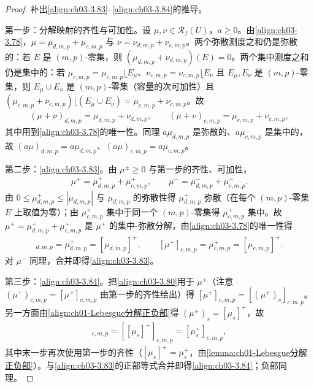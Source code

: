 \documentclass[../../main.tex]{subfiles}%
\begin{document}
\begin{proof}
补出\eqref{align:ch03-3.83}--\eqref{align:ch03-3.84}的推导。

第一步：分解映射的齐性与可加性。设 $\mu,\nu\in\mathscr{R}_f(U)$，$a\geqslant0$。由\eqref{align:ch03-3.78}，$\mu=\mu_{d,m,p}+\mu_{c,m,p}$ 与 $\nu=\nu_{d,m,p}+\nu_{c,m,p}$。两个弥散测度之和仍是弥散的：若 $E$ 是 $(m,p)$-零集，则 $(\mu_{d,m,p}+\nu_{d,m,p})(E)=0$。两个集中测度之和仍是集中的：若 $\mu_{c,m,p}=\mu_{c,m,p}\lfloor E_\mu$、$\nu_{c,m,p}=\nu_{c,m,p}\lfloor E_\nu$ 且 $E_\mu,E_\nu$ 是 $(m,p)$-零集，则 $E_\mu\cup E_\nu$ 是 $(m,p)$-零集（容量的次可加性）且 $(\mu_{c,m,p}+\nu_{c,m,p})\lfloor(E_\mu\cup E_\nu)=\mu_{c,m,p}+\nu_{c,m,p}$。故
\begin{align*}
(\mu+\nu)_{d,m,p}=\mu_{d,m,p}+\nu_{d,m,p},\qquad (\mu+\nu)_{c,m,p}=\mu_{c,m,p}+\nu_{c,m,p},
\end{align*}
其中用到\eqref{align:ch03-3.78}的唯一性。同理 $a\mu_{d,m,p}$ 是弥散的、$a\mu_{c,m,p}$ 是集中的，故 $(a\mu)_{d,m,p}=a\mu_{d,m,p}$、$(a\mu)_{c,m,p}=a\mu_{c,m,p}$。

第二步：\eqref{align:ch03-3.83}。由 $\mu^\pm\geqslant0$ 与第一步的齐性、可加性，
\begin{align*}
\mu^+=\mu_{d,m,p}^++\mu_{c,m,p}^+,\qquad \mu^-=\mu_{d,m,p}^-+\mu_{c,m,p}^-.
\end{align*}
由 $0\leqslant\mu_{d,m,p}^+\leqslant|\mu_{d,m,p}|$ 与 $\mu_{d,m,p}$ 的弥散性得 $\mu_{d,m,p}^+$ 弥散（在每个 $(m,p)$-零集 $E$ 上取值为零）；由 $\mu_{c,m,p}^+$ 集中于同一个 $(m,p)$-零集得 $\mu_{c,m,p}^+$ 集中。故 $\mu^+=\mu_{d,m,p}^++\mu_{c,m,p}^+$ 是 $\mu^+$ 的集中-弥散分解，由\eqref{align:ch03-3.78}的唯一性得
\begin{align*}
[\mu^+]_{d,m,p}=\mu_{d,m,p}^+=[\mu_{d,m,p}]^+,\qquad [\mu^+]_{c,m,p}=\mu_{c,m,p}^+=[\mu_{c,m,p}]^+.
\end{align*}
对 $\mu^-$ 同理，合并即得\eqref{align:ch03-3.83}。

第三步：\eqref{align:ch03-3.84}。把\eqref{align:ch03-3.80}用于 $\mu^+$（注意 $(\mu^+)_{c,m,p}=[\mu^+]_{c,m,p}$ 由第一步的齐性给出）得 $[\mu^+]_{c,m,p}=[(\mu^+)_s]_{c,m,p}$。另一方面由\eqref{align:ch01-Lebesgue分解正负部}得 $(\mu^+)_s=[\mu_s]^+$，故
\begin{align*}
[\mu^+]_{c,m,p}=[[\mu_s]^+]_{c,m,p}=[\mu_s^+]_{c,m,p},
\end{align*}
其中末一步再次使用第一步的齐性（$[\mu_s]^+=\mu_s^+$，由\cref{lemma:ch01-Lebesgue分解正负部}）。与\eqref{align:ch03-3.83}的正部等式合并即得\eqref{align:ch03-3.84}；负部同理。
\end{proof}
\end{document}
